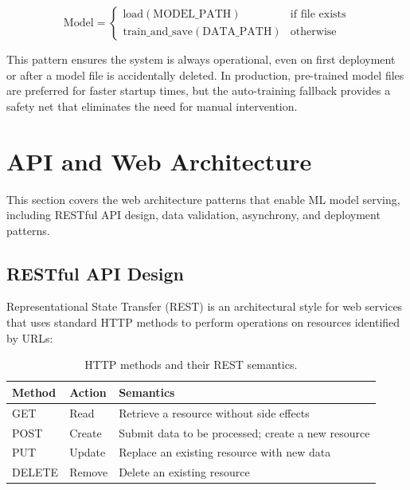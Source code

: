 \documentclass[10pt,a4paper]{article}
\begin{document}
\begin{equation}
\text{Model} = \begin{cases} \text{load}(\text{MODEL\_PATH}) & \text{if file exists} \\ \text{train\_and\_save}(\text{DATA\_PATH}) & \text{otherwise} \end{cases}
\label{eq:auto-training}
\end{equation}

This pattern ensures the system is always operational, even on first deployment or after a model file is accidentally deleted. In production, pre-trained model files are preferred for faster startup times, but the auto-training fallback provides a safety net that eliminates the need for manual intervention.

\section{API and Web Architecture}
\label{sec:api-web}

This section covers the web architecture patterns that enable ML model serving, including RESTful API design, data validation, asynchrony, and deployment patterns.

\subsection{RESTful API Design}
\label{sec:rest-api}

Representational State Transfer (REST) is an architectural style for web services that uses standard HTTP methods to perform operations on resources identified by URLs:

\begin{table}[H]
\centering
\caption{HTTP methods and their REST semantics.}
\label{tab:http-methods}
\begin{tabular}{llp{6cm}}
\toprule
\textbf{Method} & \textbf{Action} & \textbf{Semantics} \\
\midrule
GET & Read & Retrieve a resource without side effects \\
POST & Create & Submit data to be processed; create a new resource \\
PUT & Update & Replace an existing resource with new data \\
DELETE & Remove & Delete an existing resource \\
\bottomrule
\end{tabular}
\end{table}
\end{document}

